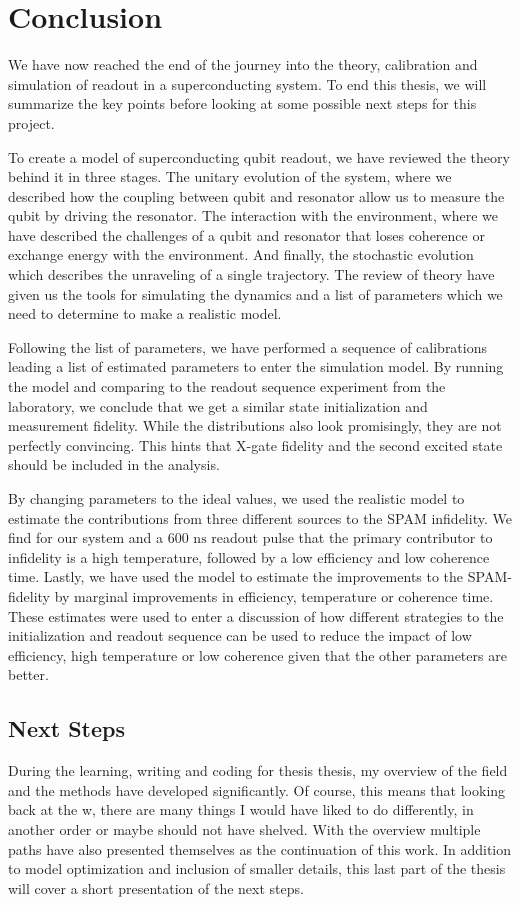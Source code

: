 \chapter{Conclusion}\label{chap:conclusion}
We have now reached the end of the journey into the theory, calibration and simulation of readout in a superconducting system.  To end this thesis, we will summarize the key points before looking at some possible next steps for this project.

To create a model of superconducting qubit readout, we have reviewed the theory behind it in three stages. The unitary evolution of the system, where we described how the coupling between qubit and resonator allow us to measure the qubit by driving the resonator. The interaction with the environment, where we have described the challenges of a qubit and resonator that loses coherence or exchange energy with the environment. And finally, the stochastic evolution which describes the unraveling of a single trajectory. The review of theory have given us the tools for simulating the dynamics and a list of parameters which we need to determine to make a realistic model.

Following the list of parameters, we have performed a sequence of calibrations leading a list of estimated parameters to enter the simulation model. By running the model and comparing to the readout sequence experiment from the laboratory, we conclude that we get a similar state initialization and measurement fidelity. While the distributions also look promisingly, they are not perfectly convincing. This hints that X-gate fidelity and the second excited state should be included in the analysis. 

By changing parameters to the ideal values, we used the realistic model to estimate the contributions from three different sources to the SPAM infidelity. We find for our system and a $600 \text{ ns}$ readout pulse that the primary contributor to infidelity is a high temperature, followed by a low efficiency and low coherence time. Lastly, we have used the model to estimate the improvements to the SPAM-fidelity by marginal improvements in efficiency, temperature or coherence time. These estimates were used to enter a discussion of how different strategies to the initialization and readout sequence can be used to reduce the impact of low efficiency, high temperature or low coherence given that the other parameters are better. 


\section{Next Steps}
During the learning, writing and coding  for thesis thesis, my overview of the field and the methods have developed significantly. Of course, this means that looking back at the w, there are many things I would have liked to do differently, in another order or maybe should not have shelved. With the overview multiple paths have also presented themselves as the continuation of this work. In addition to model optimization and inclusion of smaller details, this last part of the thesis will cover a short presentation of the next steps.

